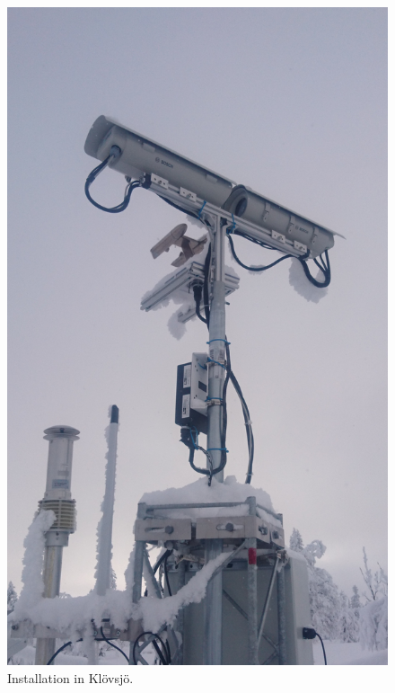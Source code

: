 \begin{figure}[ht]
\centering\includegraphics[width=0.75\linewidth]{figures/installation1}
\caption{Installation in Klövsjö.}
\label{fig:installation1}
\end{figure}

